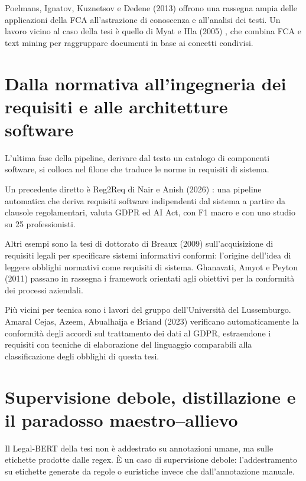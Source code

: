 \documentclass[12pt,a4paper,oneside]{report}
\begin{document}
Poelmans, Ignatov, Kuznetsov e Dedene (2013) \cite{poelmans2013fca} offrono una rassegna ampia delle applicazioni della FCA all'astrazione di conoscenza e all'analisi dei testi.
Un lavoro vicino al caso della tesi è quello di Myat e Hla (2005) \cite{myat2005fca}, che combina FCA e text mining per raggruppare documenti in base ai concetti condivisi.

\section{Dalla normativa all'ingegneria dei requisiti e alle architetture software}
L'ultima fase della pipeline, derivare dal testo un catalogo di componenti software, si colloca nel filone che traduce le norme in requisiti di sistema.

Un precedente diretto è Reg2Req di Nair e Anish (2026) \cite{nair2026reg2req}: una pipeline automatica che deriva requisiti software indipendenti dal sistema a partire da clausole regolamentari, valuta GDPR ed AI Act, con F1 macro e con uno studio su 25 professionisti.

Altri esempi sono la tesi di dottorato di Breaux (2009) \cite{breaux2009legal} sull'acquisizione di requisiti legali per specificare sistemi informativi conformi: l'origine dell'idea di leggere obblighi normativi come requisiti di sistema. Ghanavati, Amyot e Peyton (2011) \cite{ghanavati2011systematic} passano in rassegna i framework orientati agli obiettivi per la conformità dei processi aziendali.

Più vicini per tecnica sono i lavori del gruppo dell'Università del Lussemburgo. Amaral Cejas, Azeem, Abualhaija e Briand (2023) \cite{amaralcejas2023dpa} verificano automaticamente la conformità degli accordi sul trattamento dei dati al GDPR, estraendone i requisiti con tecniche di elaborazione del linguaggio comparabili alla classificazione degli obblighi di questa tesi.

\section{Supervisione debole, distillazione e il paradosso maestro--allievo}

Il Legal-BERT della tesi non è addestrato su annotazioni umane, ma sulle etichette prodotte dalle regex. È un caso di supervisione debole: l'addestramento su etichette generate da regole o euristiche invece che dall'annotazione manuale.
\end{document}
